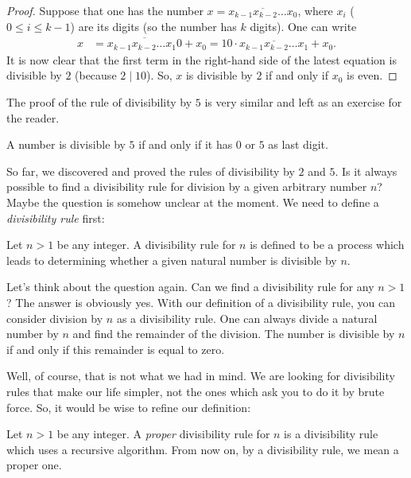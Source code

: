 \documentclass{subfile}
\begin{document}
	\begin{proof}
		Suppose that one has the number $x = \overline{x_{k-1}x_{k-2} \ldots x_0}$, where $x_i$ ($0 \leq i \leq k-1$) are its digits (so the number has $k$ digits). One can write
			\begin{align*}
				x &= \overline{x_{k-1} x_{k-2} \ldots x_1 0} + x_0 = 10 \cdot \overline{x_{k-1} x_{k-2} \ldots x_1} + x_0.
			\end{align*}
		It is now clear that the first term in the right-hand side of the latest equation is divisible by $2$ (because $2 \mid 10$). So, $x$ is divisible by $2$ if and only if $x_0$ is even.
	\end{proof}

The proof of the rule of divisibility by $5$ is very similar and left as an exercise for the reader.

	\begin{proposition}[Divisibility by $5$]
		A number is divisible by $5$ if and only if it has $0$ or $5$ as last digit.
	\end{proposition}

So far, we discovered and proved the rules of divisibility by $2$ and $5$. Is it always possible to find a divisibility rule for division by a given arbitrary number $n$? Maybe the question is somehow unclear at the moment. We need to define a \textit{divisibility rule} first:

	\begin{definition}
		Let $n>1$ be any integer. A divisibility rule for $n$ is defined to be a process which leads to determining whether a given natural number is divisible by $n$.
	\end{definition}

Let's think about the question again. Can we find a divisibility rule for any $n>1$? The answer is obviously yes. With our definition of a divisibility rule, you can consider division by $n$ as a divisibility rule. One can always divide a natural number by $n$ and find the remainder of the division. The number is divisible by $n$ if and only if this remainder is equal to zero.

Well, of course, that is not what we had in mind. We are looking for divisibility rules that make our life simpler, not the ones which ask you to do it by brute force. So, it would be wise to refine our definition:

	\begin{definition}
		Let $n>1$ be any integer. A \textit{proper} divisibility rule for $n$ is a divisibility rule which uses a recursive algorithm. From now on, by a divisibility rule, we mean a proper one.
	\end{definition}
\end{document}
